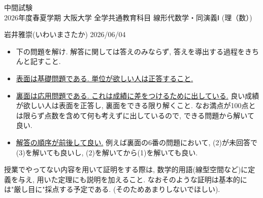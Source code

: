 \documentclass[dvipdfmx,a4paper,11pt]{article}
\theoremstyle{definition}
\begin{document}
\pagestyle{empty}



\begin{center}
{\LARGE 中間試験} \\

{2026年度春夏学期 大阪大学 全学共通教育科目 線形代数学・同演義Ⅰ (理（数）)}
\end{center}

\begin{flushright}
 岩井雅崇(いわいまさたか) 2026/06/04
\end{flushright}



  
\begin{itemize}
 \setlength{\parskip}{0cm} %
  \setlength{\itemsep}{0cm}
\item 下の問題を解け.  解答に関しては答えのみならず, 答えを導出する過程をきちんと記すこと. 
\item \underline{表面は基礎問題である. 単位が欲しい人は正答すること.} 
\item \underline{裏面は応用問題である. これは成績に差をつけるために出している.} 良い成績が欲しい人は表面を正答し, 裏面をできる限り解くこと. なお満点が100点とは限らず点数を含めて何も考えずに出しているので, できる問題から解いて良い.
\item \underline{解答の順序が前後して良い.} 例えば裏面の6番の問題において, (2)が未回答で(3)を解いても良いし, (2)を解いてから(1)を解いても良い. 
  \end{itemize}
  
   \begin{tcolorbox}[mybox]
 授業でやってない内容を用いて証明をする際は, 数学的用語(線型空間など)に定義を与え, 用いた定理にも説明を加えること. 
 なおそのような証明は基本的には"厳し目に"採点する予定である. (そのためあまりしないでほしい).
 \end{tcolorbox}
 
\end{document}
